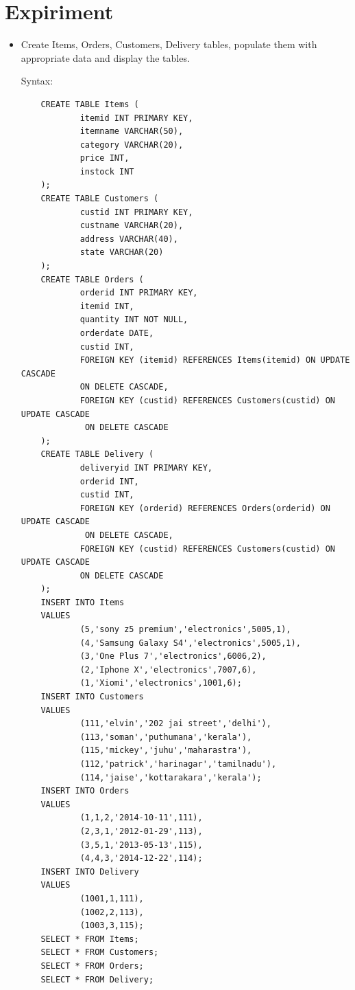 \documentclass[13pt,oneside]{book}
\begin{document}
\section*{Expiriment}
\begin{itemize}
	\item
	Create Items, Orders, Customers, Delivery tables, populate them with appropriate data
	 and display the tables.
	 
	Syntax:
	\begin{verbatim}
	CREATE TABLE Items (
			itemid INT PRIMARY KEY,
			itemname VARCHAR(50),
			category VARCHAR(20),
			price INT,
			instock INT
	);
	CREATE TABLE Customers (
			custid INT PRIMARY KEY,
			custname VARCHAR(20),
			address VARCHAR(40),
			state VARCHAR(20)
	);
	CREATE TABLE Orders (
			orderid INT PRIMARY KEY,
			itemid INT,
			quantity INT NOT NULL,
			orderdate DATE,
			custid INT,
			FOREIGN KEY (itemid) REFERENCES Items(itemid) ON UPDATE CASCADE
			ON DELETE CASCADE,
			FOREIGN KEY (custid) REFERENCES Customers(custid) ON UPDATE CASCADE
			 ON DELETE CASCADE 
	);
	CREATE TABLE Delivery (
			deliveryid INT PRIMARY KEY,
			orderid INT,
			custid INT,
			FOREIGN KEY (orderid) REFERENCES Orders(orderid) ON UPDATE CASCADE
			 ON DELETE CASCADE,
			FOREIGN KEY (custid) REFERENCES Customers(custid) ON UPDATE CASCADE 
			ON DELETE CASCADE 
	);
	INSERT INTO Items
	VALUES
			(5,'sony z5 premium','electronics',5005,1),
			(4,'Samsung Galaxy S4','electronics',5005,1),
			(3,'One Plus 7','electronics',6006,2),
			(2,'Iphone X','electronics',7007,6),
			(1,'Xiomi','electronics',1001,6);
	INSERT INTO Customers
	VALUES
			(111,'elvin','202 jai street','delhi'),
			(113,'soman','puthumana','kerala'),
			(115,'mickey','juhu','maharastra'),
			(112,'patrick','harinagar','tamilnadu'),
			(114,'jaise','kottarakara','kerala');
	INSERT INTO Orders
	VALUES
			(1,1,2,'2014-10-11',111),
			(2,3,1,'2012-01-29',113),
			(3,5,1,'2013-05-13',115),
			(4,4,3,'2014-12-22',114);
	INSERT INTO Delivery
	VALUES
			(1001,1,111),
			(1002,2,113),
			(1003,3,115);
	SELECT * FROM Items;
	SELECT * FROM Customers;
	SELECT * FROM Orders;
	SELECT * FROM Delivery;
	

\end{verbatim}
\end{itemize}
\end{document}
